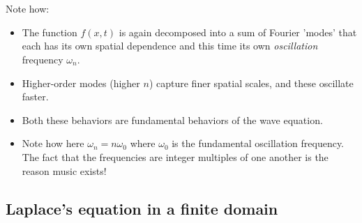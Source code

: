 \\
\\
Note how: 
\begin{itemize}
    \item The function $f(x,t)$ is again decomposed into a sum of Fourier 'modes' that each has its own spatial dependence and this time its own {\it oscillation} frequency $\omega_n$. 
    \item Higher-order modes (higher $n$)  capture finer spatial scales, and these oscillate faster. 
    \item Both these behaviors are fundamental behaviors of the wave equation.
    \item Note how here $\omega_n = n \omega_0$ where $\omega_0$ is the fundamental oscillation frequency. The fact that the frequencies are integer multiples of one another is the reason music exists!
\end{itemize}

\subsection{Laplace's equation in a finite domain}

